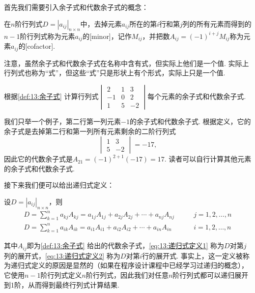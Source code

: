 首先我们需要引入余子式和代数余子式的概念：
\begin{definition} \label{def:13:余子式}
    在$n$阶行列式$D=|a_{ij}|_{n \times n}$中，去掉元素$a_{ij}$所在的第$i$行和第$j$列的所有元素而得到的$n-1$阶行列式称为元素$a_{ij}$的[minor]，记作$M_{ij}$，并把数$A_{ij}=(-1)^{i+j}M_{ij}$称为元素$a_{ij}$的[cofactor].
\end{definition}
注意，虽然余子式和代数余子式在名称中含有式，但实际上他们是一个值. 实际上行列式也称为``式''，但这些``式''只是形状上有个形式，实际上只是一个值.
\begin{example} \label{ex:13:余子式}
    根据\autoref{def:13:余子式} 计算行列式$\begin{vmatrix}
            2  & 1 & 3  \\
            -1 & 0 & 2  \\
            1  & 5 & -2
        \end{vmatrix}$每个元素的余子式和代数余子式.
\end{example}

\begin{solution}
    我们只举一个例子，第二行第一列元素$-1$的余子式和代数余子式. 根据定义，它的余子式是去掉第二行和第一列所有元素剩余的二阶行列式
    \[\begin{vmatrix}
            1 & 3 \\
            5 & -2
        \end{vmatrix}=-17,\]
    因此它的代数余子式是$A_{21}=(-1)^{2+1}(-17)=17$. 读者可以自行计算其他元素的余子式和代数余子式.
\end{solution}

接下来我们便可以给出递归式定义：
\begin{definition} \label{def:13:递归式定义}
    设$D=|a_{ij}|_{n \times n}$，则
    \begin{align}
        \label{eq:13:递归式定义1}
        D=\sum_{k=1}^{n}a_{kj}A_{kj}=a_{1j}A_{1j}+a_{2j}A_{2j}+\cdots+a_{nj}A_{nj} & \qquad j=1,2,\ldots,n \\
        \label{eq:13:递归式定义2}
        D=\sum_{k=1}^{n}a_{ik}A_{ik}=a_{i1}A_{i1}+a_{i2}A_{i2}+\cdots+a_{in}A_{in} & \qquad i=1,2,\ldots,n
    \end{align}
\end{definition}
其中$A_{ij}$即为\autoref{def:13:余子式} 给出的代数余子式，\autoref{eq:13:递归式定义1} 称为$D$对第$j$列的展开式，\autoref{eq:13:递归式定义2} 称为$D$对第$i$行的展开式. 事实上，这一定义被称为递归式定义的原因是显然的（如果在程序设计课程中已经学习过递归的概念），它使用$n-1$阶行列式定义$n$阶行列式，因此我们对任意$n$阶行列式都可以递归展开到1阶，从而得到最终行列式计算结果.

